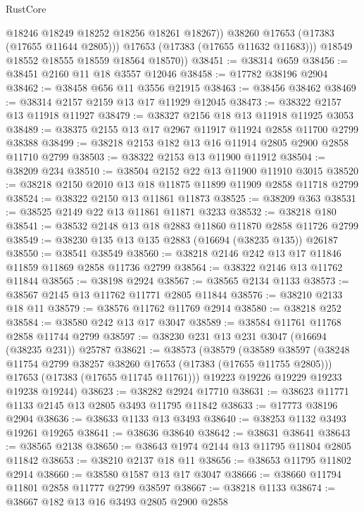 \begin{lexlean}{RustCore}
\begin{coremodule}
                @18246
                @18249
                @18252
                @18256
                @18261
                @18267))
            @38260
            @17653
            (@17383 (@17655 @11644 @2805)))
          @17653
          (@17383 (@17655 @11632 @11683)))
        @18549
        @18552
        @18555
        @18559
        @18564
        @18570))
@38451 := @38314 @659
@38456 := @38451 @2160 @11 @18 @3557 @12046
@38458 := @17782 @38196 @2904
@38462 := @38458 @656 @11 @3556 @21915
@38463 := @38456 @38462
@38469 := @38314 @2157 @2159 @13 @17 @11929 @12045
@38473 := @38322 @2157 @13 @11918 @11927
@38479 := @38327 @2156 @18 @13 @11918 @11925 @3053
@38489 := @38375 @2155 @13 @17 @2967 @11917 @11924 @2858 @11700 @2799 @38388
@38499 := @38218 @2153 @182 @13 @16 @11914 @2805 @2900 @2858 @11710 @2799
@38503 := @38322 @2153 @13 @11900 @11912
@38504 := @38209 @234
@38510 := @38504 @2152 @22 @13 @11900 @11910 @3015
@38520 := @38218 @2150 @2010 @13 @18 @11875 @11899 @11909 @2858 @11718 @2799
@38524 := @38322 @2150 @13 @11861 @11873
@38525 := @38209 @363
@38531 := @38525 @2149 @22 @13 @11861 @11871 @3233
@38532 := @38218 @180
@38541 := @38532 @2148 @13 @18 @2883 @11860 @11870 @2858 @11726 @2799
@38549 := @38230 @135 @13 @135 @2883 (@16694 (@38235 @135)) @26187
@38550 := @38541 @38549
@38560 := @38218 @2146 @242 @13 @17 @11846 @11859 @11869 @2858 @11736 @2799
@38564 := @38322 @2146 @13 @11762 @11844
@38565 := @38198 @2924
@38567 := @38565 @2134 @1133
@38573 := @38567 @2145 @13 @11762 @11771 @2805 @11844
@38576 := @38210 @2133 @18 @11
@38579 := @38576 @11762 @11769 @2914
@38580 := @38218 @252
@38584 := @38580 @242 @13 @17 @3047
@38589 := @38584 @11761 @11768 @2858 @11744 @2799
@38597 := @38230 @231 @13 @231 @3047 (@16694 (@38235 @231)) @25787
@38621 := @38573
    (@38579
      (@38589
        @38597
        (@38248 @11754 @2799 @38257 @38260 @17653 (@17383 (@17655 @11755 @2805)))
        @17653
        (@17383 (@17655 @11745 @11761)))
      @19223
      @19226
      @19229
      @19233
      @19238
      @19244)
@38623 := @38282 @2924 @17710
@38631 := @38623 @11771 @1133 @2145 @13 @2805 @3493 @11795 @11842
@38633 := @17773 @38196 @2904
@38636 := @38633 @1133 @13 @3493
@38640 := @38253 @1132 @3493 @19261 @19265
@38641 := @38636 @38640
@38642 := @38631 @38641
@38643 := @38565 @2138
@38650 := @38643 @1974 @2144 @13 @11795 @11804 @2805 @11842
@38653 := @38210 @2137 @18 @11
@38656 := @38653 @11795 @11802 @2914
@38660 := @38580 @1587 @13 @17 @3047
@38666 := @38660 @11794 @11801 @2858 @11777 @2799 @38597
@38667 := @38218 @1133
@38674 := @38667 @182 @13 @16 @3493 @2805 @2900 @2858

\end{coremodule}
\end{lexlean}

